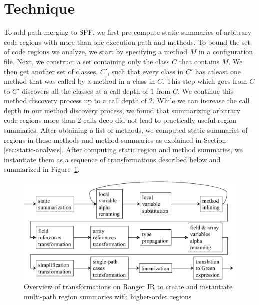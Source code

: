 \section{Technique}
%
To add path merging to SPF, we first pre-compute static summaries of arbitrary code regions with more than one execution
path and methods.
%
To bound the set of code regions we analyze, we start by specifying a method $M$ in a configuration file.
%
Next, we construct a set containing only the class $C$ that contains $M$.
%
We then get another set of classes, $C'$,
such that every class in $C'$ has atleast one method that was called by a method in a class in $C$.
%
This step which goes from $C$ to $C'$ discovers all the classes at a call depth of 1 from $C$.
%
We continue this method discovery process up to a call depth of 2.
%
While we can increase the call depth in our method discovery process, we found that summarizing
arbitrary code regions more than 2 calls deep did not lead to practically useful region summaries.
%
After obtaining a list of methods, we computed static summaries of regions in these methods and method summaries as
explained in Section \ref{sec:static-analysis}.
%
After computing static region and method summaries, we instantiate them as a sequence of transformations described below and summarized
in Figure~\ref{fig:overview}.
%
\begin{figure}[]
    \caption{Overview of transformations on Ranger IR to create and instantiate multi-path region summaries with higher-order regions}
    \label{fig:overview}
    \includegraphics[width=\textwidth]{figures/overview.pdf}
\end{figure}
%
%
